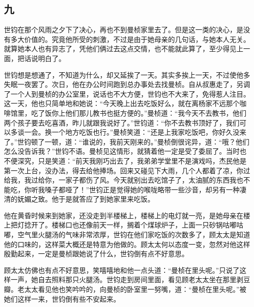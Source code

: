 \subsection{九}

\par 世钧在那个风雨之夕下了决心，再也不到曼桢家里去了。但是这一类的决心，是没有多大价值的。究竟他所受的刺激，不过是由于她母亲的几句话，与她本人无关。就算她本人也有异志了，凭他们俩过去这点交情，也不能就此算了，至少得见上一面，把话说明白了。
\par 世钧想是想通了，不知道为什么，却又延挨了一天。其实多挨上一天，不过使他多失眠一夜罢了。次日，他在办公时间跑到总办事处去找曼桢。自从叔惠走了，另调了一个人到曼桢的办公室里，说话也不大方便，世钧也不大来了，免得惹人注目。这一天，他也只简单地和她说：“今天晚上出去吃饭好么，就在离杨家不远那个咖啡馆里，吃了饭你上他们那儿教书也挺方便的。”曼桢道：“我今天不去教书，他们两个孩子要去吃喜酒，昨儿就跟我说好了。”世钧道：“你不去教书顶好了，我们可以多谈一会。换一个地方吃饭也行。”曼桢笑道：“还是上我家吃饭吧，你好久没来了。”世钧顿了一顿，道：“谁说的，我前天刚来的。”曼桢倒很诧异，道：“哦？他们怎么没告诉我？”世钧不语。曼桢见这情形，就猜着他一定是受了委屈了。当时也不便深究，只是笑道：“前天我刚巧出去了，我弟弟学堂里不是演戏吗，杰民他是第一次上台，没办法，得去给他捧场。回来又碰见下大雨，几个人都着了凉，你过给我，我过给你，一家子都伤了风。今天就别出去吃馆子了，太油腻的东西我也不能吃，你听我嗓子都哑了！”世钧正是觉得她的喉咙略带一些沙音，却另有一种凄清的妩媚之致。他于是就答应了到她家里来吃饭。
\par 他在黄昏时候来到她家，还没走到半楼梯上，楼梯上的电灯就一亮，是她母亲在楼上把灯捻开了。楼梯口也还像前天一样，搁着个煤球炉子，上面一只砂锅咕嘟咕嘟，空气里火腿汤的气味非常浓厚，世钧在他们家吃饭的次数多了，顾太太是知道他的口味的，这样菜大概还是特意为他做的。顾太太何以态度一变，忽然对他这样殷勤起来，一定是曼桢跟她说了什么，世钧倒有点不好意思。
\par 顾太太仿佛也有点不好意思，笑嘻嘻地和他一点头道：“曼桢在里头呢。”只说了这样一声，她自去照料那只火腿汤。世钧走到房间里面，看见顾老太太坐在那里剥豆瓣。老太太看见他也笑吟吟的，向曼桢的卧室里一努嘴，道：“曼桢在里头呢。”被她们这样一来，世钧倒有些不安起来。
